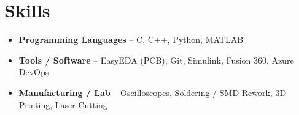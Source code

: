 \documentclass[a4paper,10pt]{article} %
\begin{document}
\section*{Skills}
\begin{itemize}
    \item \textbf{Programming Languages} – C, C++, Python, MATLAB
    \item \textbf{Tools / Software} – EasyEDA (PCB), Git, Simulink, Fusion 360, Azure DevOps
    \item \textbf{Manufacturing / Lab} – Oscilloscopes, Soldering / SMD Rework, 3D Printing, Laser Cutting
\end{itemize}
\end{document}
